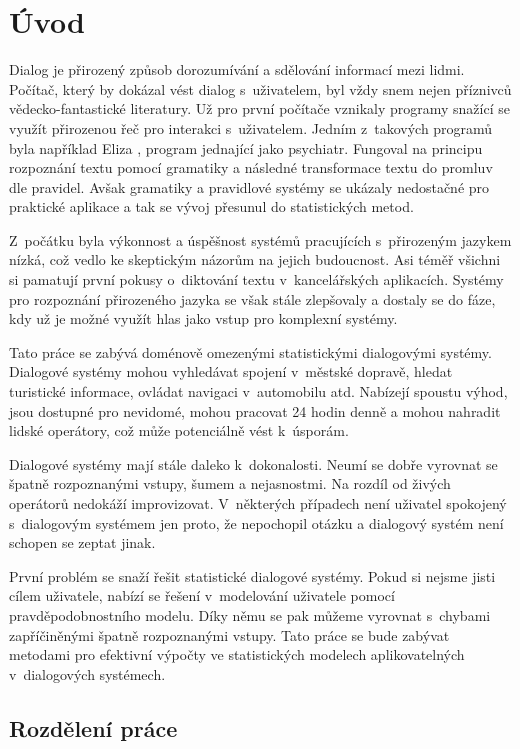 \chapter*{Úvod}

Dialog je přirozený způsob dorozumívání a sdělování informací mezi lidmi.
Počítač, který by dokázal vést dialog s~uživatelem, byl vždy snem nejen příznivců vědecko-fantastické literatury.
Už pro první počítače vznikaly programy snažící se využít přirozenou řeč pro interakci s~uživatelem.
Jedním z~takových programů byla například Eliza \cite{weizenbaum1966eliza}, program jednající jako psychiatr.
Fungoval na principu rozpoznání textu pomocí gramatiky a následné transformace textu do promluv dle pravidel.
Avšak gramatiky a pravidlové systémy se ukázaly nedostačné pro praktické aplikace a tak se vývoj přesunul do statistických metod.

Z~počátku byla výkonnost a úspěšnost systémů pracujících s~přirozeným jazykem nízká, což vedlo ke skeptickým názorům na jejich budoucnost.
Asi téměř všichni si pamatují první pokusy o~diktování textu v~kancelářských aplikacích.
Systémy pro rozpoznání přirozeného jazyka se však stále zlepšovaly a dostaly se do fáze, kdy už je možné využít hlas jako vstup pro komplexní systémy.

Tato práce se zabývá doménově omezenými statistickými dialogovými systémy.
Dialogové systémy mohou vyhledávat spojení v~městské dopravě, hledat turistické informace, ovládat navigaci v~automobilu atd.
Nabízejí spoustu výhod, jsou dostupné pro nevidomé, mohou pracovat 24 hodin denně a mohou nahradit lidské operátory, což může potenciálně vést k~úsporám.

Dialogové systémy mají stále daleko k~dokonalosti.
Neumí se dobře vyrovnat se špatně rozpoznanými vstupy, šumem a nejasnostmi.
Na rozdíl od živých operátorů nedokáží improvizovat.
V~některých případech není uživatel spokojený s~dialogovým systémem jen proto, že nepochopil otázku a dialogový systém není schopen se zeptat jinak.

První problém se snaží řešit statistické dialogové systémy.
Pokud si nejsme jisti cílem uživatele, nabízí se řešení v~modelování uživatele pomocí pravděpodobnostního modelu.
Díky němu se pak můžeme vyrovnat s~chybami zapříčiněnými špatně rozpoznanými vstupy.
Tato práce se bude zabývat metodami pro efektivní výpočty ve statistických modelech aplikovatelných v~dialogových systémech.

\section*{Rozdělení práce}

